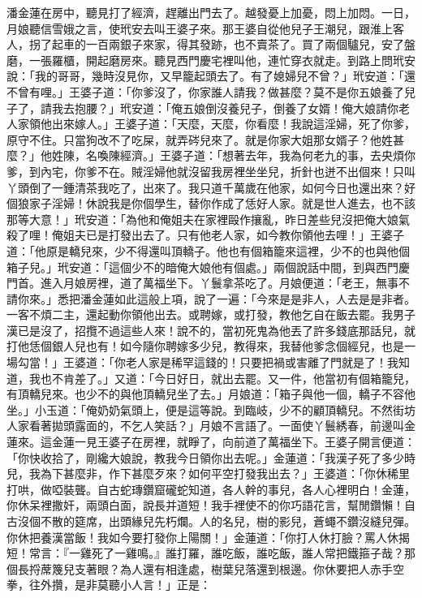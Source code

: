 潘金蓮在房中，聽見打了經濟，趕離出門去了。越發憂上加憂，悶上加悶。一日，月娘聽信雪娥之言，使玳安去叫王婆子來。那王婆自從他兒子王潮兒，跟淮上客人，拐了起車的一百兩銀子來家，得其發跡，也不賣茶了。買了兩個驢兒，安了盤磨，一張羅櫃，開起磨房來。聽見西門慶宅裡叫他，連忙穿衣就走。到路上問玳安說：「我的哥哥，幾時沒見你，又早籠起頭去了。有了媳婦兒不曾？」玳安道：「還不曾有哩。」王婆子道：「你爹沒了，你家誰人請我？做甚麼？莫不是你五娘養了兒子了，請我去抱腰？」玳安道：「俺五娘倒沒養兒子，倒養了女婿！俺大娘請你老人家領他出來嫁人。」王婆子道：「天麼，天麼，你看麼！我說這淫婦，死了你爹，原守不住。只當狗改不了吃屎，就弄硶兒來了。就是你家大姐那女婿子？他姓甚麼？」他姓陳，名喚陳經濟。」王婆子道：「想著去年，我為何老九的事，去央煩你爹，到內宅，你爹不在。賊淫婦他就沒留我房裡坐坐兒，折針也迸不出個來！只叫丫頭倒了一鍾清茶我吃了，出來了。我只道千萬歲在他家，如何今日也還出來？好個狼家子淫婦！休說我是你個學生，替你作成了恁好人家。就是世人進去，也不該那等大意！」玳安道：「為他和俺姐夫在家裡毆作攘亂，昨日差些兒沒把俺大娘氣殺了哩！俺姐夫已是打發出去了。只有他老人家，如今教你領他去哩！」王婆子道：「他原是轎兒來，少不得還叫頂轎子。他也有個箱籠來這裡，少不的也與他個箱子兒。」玳安道：「這個少不的暗俺大娘他有個處。」兩個說話中間，到與西門慶門首。進入月娘房裡，道了萬福坐下。丫鬟拿茶吃了。月娘便道：「老王，無事不請你來。」悉把潘金蓮如此這般上項，說了一遍：「今來是是非人，人去是是非者。一客不煩二主，還起動你領他出去。或聘嫁，或打發，教他乞自在飯去罷。我男子漢已是沒了，招攬不過這些人來！說不的，當初死鬼為他丟了許多錢底那話兒，就打他恁個銀人兒也有！如今隨你聘嫁多少兒，教得來，我替他爹念個經兒，也是一場勾當！」王婆道：「你老人家是稀罕這錢的！只要把禍或害離了門就是了！我知道，我也不肯差了。」又道：「今日好日，就出去罷。又一件，他當初有個箱籠兒，有頂轎兒來。也少不的與他頂轎兒坐了去。」月娘道：「箱子與他一個，轎子不容他坐。」小玉道：「俺奶奶氣頭上，便是這等說。到臨岐，少不的顧頂轎兒。不然街坊人家看著拋頭露面的，不乞人笑話？」月娘不言語了。一面使丫鬟綉春，前邊叫金蓮來。這金蓮一見王婆子在房裡，就睜了，向前道了萬福坐下。王婆子開言便道：「你快收拾了，剛纔大娘說，教我今日領你出去呢。」金蓮道：「我漢子死了多少時兒，我為下甚麼非，作下甚麼歹來？如何平空打發我出去？」王婆道：「你休稀里打哄，做啞裝聾。自古蛇瑼鑽窟礲蛇知道，各人幹的事兒，各人心裡明白！金蓮，你休呆裡撒奸，兩頭白面，說長并道短！我手裡使不的你巧語花言，幫閒鑽懶！自古沒個不散的筵席，出頭緣兒先朽爛。人的名兒，樹的影兒，蒼蠅不鑽沒縫兒彈。你休把養漢當飯！我如今要打發你上陽關！」金蓮道：「你打人休打臉？罵人休揭短！常言：『一雞死了一雞鳴。』誰打羅，誰吃飯，誰吃飯，誰人常把鐵箍子哉？那個長捋蓆篾兒支著眼？為人還有相逢處，樹葉兒落還到根邊。你休要把人赤手空拳，往外攢，是非莫聽小人言！」正是：

